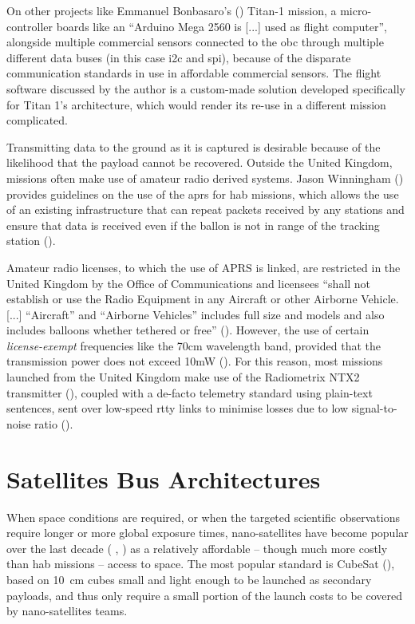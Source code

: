 On other projects like Emmanuel Bonbasaro's (\cite{Bombasaro2015}) Titan-1 mission, a micro-controller boards like an ``Arduino Mega 2560 is [...] used as flight computer'', alongside multiple commercial sensors connected to the \acrshort{obc} through multiple different data buses (in this case \acrfull{i2c} and \acrfull{spi}), because of the disparate communication standards in use in affordable commercial sensors. The flight software discussed by the author is a custom-made solution developed specifically for Titan 1's architecture, which would render its re-use in a different mission complicated.

Transmitting data to the ground as it is captured is desirable because of the likelihood that the payload cannot be recovered. Outside the United Kingdom, missions often make use of amateur radio derived systems. Jason Winningham (\cite{Winningham2006}) provides guidelines on the use of the \acrfull{aprs} for \acrshort{hab} missions, which allows the use of an existing infrastructure that can repeat packets received by any stations and ensure that data is received even if the ballon is not in range of the tracking station (\cite{TheAPRSWorkingGroup2000}).

Amateur radio licenses, to which the use of APRS is linked, are restricted in the United Kingdom by the Office of Communications and licensees ``shall not establish or use the Radio Equipment in any Aircraft or other Airborne Vehicle. [...] ``Aircraft'' and ``Airborne Vehicles'' includes full size and models and also includes balloons whether tethered or free'' (\cite{Ofcom2017}). However, the use of certain \textit{license-exempt} frequencies like the 70cm wavelength band, provided that the transmission power does not exceed 10mW (\cite{Ofcom2014}). For this reason, most missions launched from the United Kingdom make use of the Radiometrix NTX2 transmitter (\cite{radiometrix2012}), coupled with a de-facto telemetry standard using plain-text sentences, sent over low-speed  \acrfull{rtty} links to minimise losses due to low signal-to-noise ratio (\cite{UKHAS2015}).

\section{Satellites Bus Architectures}

When space conditions are required, or when the targeted scientific observations require longer or more global exposure times, nano-satellites have become popular over the last decade ( \cite{McDowell2017a}, \cite{McDowell2017}) as a relatively affordable – though much more costly than \acrshort{hab} missions – access to space. The most popular standard is CubeSat (\cite{Heidt2000}), based on \SI{10}{\centi\metre} cubes small and light enough to be launched as secondary payloads, and thus only require a small portion of the launch costs to be covered by nano-satellites teams.

